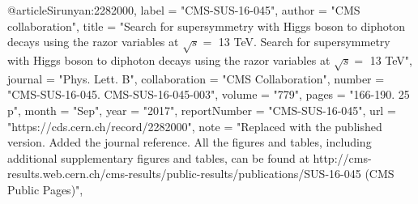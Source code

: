 @article{Sirunyan:2282000,
      label          = "CMS-SUS-16-045",
      author        = "{CMS collaboration}",
      title         = "{Search for supersymmetry with Higgs boson to diphoton
                       decays using the razor variables at $\sqrt{s} = $ 13 TeV.
                       Search for supersymmetry with Higgs boson to diphoton
                       decays using the razor variables at $\sqrt{s}=$ 13 TeV}",
      journal       = "Phys. Lett. B",
      collaboration = "CMS Collaboration",
      number        = "CMS-SUS-16-045. CMS-SUS-16-045-003",
      volume        = "779",
      pages         = "166-190. 25 p",
      month         = "Sep",
      year          = "2017",
      reportNumber  = "CMS-SUS-16-045",
      url           = "https://cds.cern.ch/record/2282000",
      note          = "Replaced with the published version. Added the journal
                       reference. All the figures and tables, including additional
                       supplementary figures and tables, can be found at
                       http://cms-results.web.cern.ch/cms-results/public-results/publications/SUS-16-045
                       (CMS Public Pages)",
}

